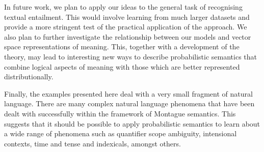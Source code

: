 \documentclass[a4paper,11pt]{article}
\theoremstyle{definition}
\begin{document}


In future work, we plan to apply our ideas to the general task of recognising textual entailment. 
This would involve learning from much larger datasets and provide a more stringent test of the practical application of the approach.
We also plan to further investigate the relationship between our models and vector space representations of meaning. This, together with a development of the theory, may lead to interesting new ways to describe probabilistic semantics that combine logical aspects of meaning with those which are better represented distributionally. 

Finally, the examples presented here deal with a very small fragment
of natural language. There are many complex natural language phenomena
that have been dealt with successfully within the framework of
Montague semantics. This suggests that it should be possible to apply
probabilistic semantics to learn about a wide range of phenomena such
as quantifier scope ambiguity, intensional contexts, time and tense
and indexicals, amongst others.





\end{document}
